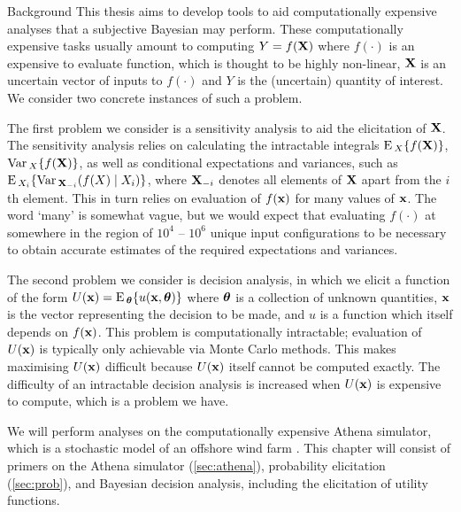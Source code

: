 \begin{chapter}{Background \label{Ch:background}}
This thesis aims to develop tools to aid computationally expensive analyses that a subjective Bayesian may perform. These computationally expensive tasks usually amount to computing $Y = f(\mathbf{X})$ where $f(\cdot)$ is an expensive to evaluate function, which is thought to be highly non-linear, $\mathbf{X}$ is an uncertain vector of inputs to $f(\cdot)$ and $Y$ is the (uncertain) quantity of interest. We consider two concrete instances of such a problem.

The first problem we consider is a sensitivity analysis to aid the elicitation of $\mathbf{X}$. The sensitivity analysis relies on calculating the intractable integrals $\textrm{E}\,_X\{f(\mathbf{X})\}$, $\mathrm{Var}\,_X \{f(\mathbf{X})\}$, as well as conditional expectations and variances, such as $\textrm{E}\,_{X_i} \{  \mathrm{Var}\,_{\mathbf{X}_{-i}}(f(X) \mid X_i) \}$, where $\mathbf{X}_{-i}$ denotes all elements of $\mathbf{X}$ apart from the $i$th element. This in turn relies on evaluation of $f(\mathbf{x})$ for many values of $\mathbf{x}$. The word `many' is somewhat vague, but we would expect that evaluating $f(\cdot)$ at somewhere in the region of $10^4$ -- $10^6$ unique input configurations to be necessary to obtain accurate estimates of the required expectations and variances.

The second problem we consider is decision analysis, in which we elicit a function of the form $U(\mathbf{x}) = \textrm{E}\,_{\bm{\theta}} \{ u(\mathbf{x}, \bm{\theta}) \}$ where $\bm{\theta}$ is a collection of unknown quantities, $\mathbf{x}$ is the vector representing the decision to be made, and $u$ is a function which itself depends on $f(\mathbf{x})$. This problem is computationally intractable; evaluation of $U(\mathbf{x})$ is typically only achievable via Monte Carlo methods. This makes maximising $U(\mathbf{x})$ difficult because $U(\mathbf{x})$ itself cannot be computed exactly. The difficulty of an intractable decision analysis is increased when $U(\mathbf{x})$ is expensive to compute, which is a problem we have.

We will perform analyses on the computationally expensive Athena simulator, which is a stochastic model of an offshore wind farm \citep{Zit13, Zit16, Zit2021}. This chapter will consist of primers on the Athena simulator (\cref{sec:athena}), probability elicitation (\cref{sec:prob}), and  Bayesian decision analysis, including the elicitation of utility functions.


\end{chapter}

